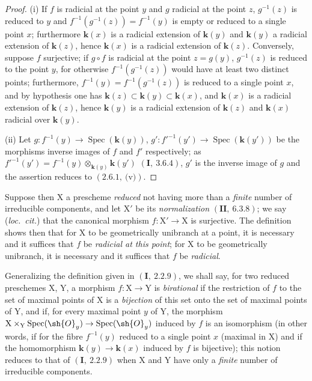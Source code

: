\begin{proof}
(i) If $f$ is radicial at the point $y$ and $g$ radicial at the point $z$, $g^{-1}(z)$ is reduced to $y$ and
$f^{-1}(g^{-1}(z))=f^{-1}(y)$ is empty or reduced to a single point $x$; furthermore $\boldsymbol{k}(x)$ is a radicial extension
of $\boldsymbol{k}(y)$ and $\boldsymbol{k}(y)$ a radicial extension of $\boldsymbol{k}(z)$, hence $\boldsymbol{k}(x)$ is a radicial extension of $\boldsymbol{k}(z)$.
Conversely, suppose $f$ surjective; if $g\circ f$ is radicial at the point $z=g(y)$, $g^{-1}(z)$ is reduced
to the point $y$, for otherwise $f^{-1}(g^{-1}(z))$ would have at least two distinct points; furthermore,
$f^{-1}(y)=f^{-1}(g^{-1}(z))$ is reduced to a single point $x$, and by hypothesis one has $\boldsymbol{k}(z)\subset\boldsymbol{k}(y)\subset\boldsymbol{k}(x)$,
and $\boldsymbol{k}(x)$ is a radicial extension of $\boldsymbol{k}(z)$, hence $\boldsymbol{k}(y)$ is a radicial extension of $\boldsymbol{k}(z)$ and $\boldsymbol{k}(x)$ radicial over $\boldsymbol{k}(y)$.

(ii) Let $g:f^{-1}(y)\to\operatorname{Spec}(\boldsymbol{k}(y))$, $g':f'^{-1}(y')\to\operatorname{Spec}(\boldsymbol{k}(y'))$ be the morphisms
inverse images of \mbox{\ensuremath{f}} and $f'$ respectively; as $f'^{-1}(y')=f^{-1}(y)\otimes_{\boldsymbol{k}(y)}\boldsymbol{k}(y')$
$(\mathbf{I},~3.6.4)$, $g'$ is the inverse image of $g$ and the assertion reduces to $(2.6.1,~\text{(v)})$.
\end{proof}

Suppose then $\mathrm{X}$ a prescheme \emph{reduced} not having more than a \emph{finite} number of irreducible components,
and let $\mathrm{X}'$ be its \emph{normalization} $(\mathbf{II},~6.3.8)$; we say (\emph{loc.~cit.}) that the canonical morphism
$f:\mathrm{X}'\to\mathrm{X}$ is surjective. The definition  shows then that for $\mathrm{X}$ to be geometrically
unibranch at a point, it is necessary and it suffices that $f$ be \emph{radicial at this point}; for
$\mathrm{X}$ to be geometrically unibranch, it is necessary and it suffices that $f$ be \emph{radicial}.

\begin{env}[6.15.4]
\label{IV.6.15.4}
Generalizing the definition given in $(\mathbf{I},~2.2.9)$, we shall say,
for two reduced preschemes $\mathrm{X}$, $\mathrm{Y}$, a morphism $f:\mathrm{X}\to\mathrm{Y}$ is \emph{birational} if the restriction
of $f$ to the set of maximal points of $\mathrm{X}$ is a \emph{bijection} of this set onto
the set of maximal points of $\mathrm{Y}$, and if, for every maximal point $y$ of $\mathrm{Y}$, the
morphism $\mathrm{X}\times_\mathrm{Y}\operatorname{Spec}(\sh{O}_y)\to\operatorname{Spec}(\sh{O}_y)$ induced by $f$ is an isomorphism (in other words,
if for the fibre $f^{-1}(y)$ reduced to a single point $x$ (maximal in $\mathrm{X}$) and if the homomorphism
$\boldsymbol{k}(y)\to\boldsymbol{k}(x)$ induced by $f$ is bijective); this notion reduces to that of $(\mathbf{I},~2.2.9)$ when $\mathrm{X}$
and $\mathrm{Y}$ have only a \emph{finite} number of irreducible components.
\end{env}

